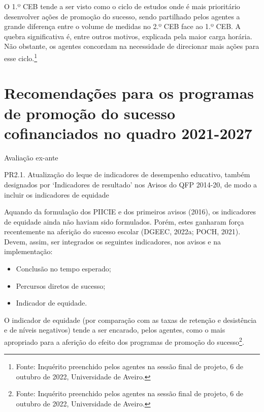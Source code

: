 \documentclass[
]{book}
\providecommand{\tightlist}{%
  \setlength{\itemsep}{0pt}\setlength{\parskip}{0pt}}
\begin{document}
O 1.º CEB tende a ser visto como o ciclo de estudos onde é mais prioritário desenvolver ações de promoção do sucesso, sendo partilhado pelos agentes a grande diferença entre o volume de medidas no 2.º CEB face ao 1.º CEB. A quebra significativa é, entre outros motivos, explicada pela maior carga horária. Não obstante, os agentes concordam na necessidade de direcionar mais ações para esse ciclo.\footnote{Fonte: Inquérito preenchido pelos agentes na sessão final de projeto, 6 de outubro de 2022, Universidade de Aveiro.}

\hypertarget{recomendauxe7uxf5es-para-os-programas-de-promouxe7uxe3o-do-sucesso-cofinanciados-no-quadro-2021-2027}{%
\section{\texorpdfstring{\textbf{Recomendações para os programas de promoção do sucesso cofinanciados no quadro 2021-2027}}{Recomendações para os programas de promoção do sucesso cofinanciados no quadro 2021-2027}}\label{recomendauxe7uxf5es-para-os-programas-de-promouxe7uxe3o-do-sucesso-cofinanciados-no-quadro-2021-2027}}

\leavevmode{}%
Avaliação ex-ante

\leavevmode{}%
PR2.1. Atualização do leque de indicadores de desempenho educativo, também designados por `Indicadores de resultado' nos Avisos do QFP 2014-20, de modo a incluir os indicadores de equidade

Aquando da formulação dos PIICIE e dos primeiros avisos (2016), os indicadores de equidade ainda não haviam sido formulados. Porém, estes ganharam força recentemente na aferição do sucesso escolar (DGEEC, 2022a; POCH, 2021). Devem, assim, ser integrados os seguintes indicadores, nos avisos e na implementação:

\begin{itemize}
\tightlist
\item
  Conclusão no tempo esperado;\\
\item
  Percursos diretos de sucesso;\\
\item
  Indicador de equidade.
\end{itemize}

O indicador de equidade (por comparação com as taxas de retenção e desistência e de níveis negativos) tende a ser encarado, pelos agentes, como o mais apropriado para a aferição do efeito dos programas de promoção do sucesso\footnote{Fonte: Inquérito preenchido pelos agentes na sessão final de projeto, 6 de outubro de 2022, Universidade de Aveiro.}.
\end{document}
